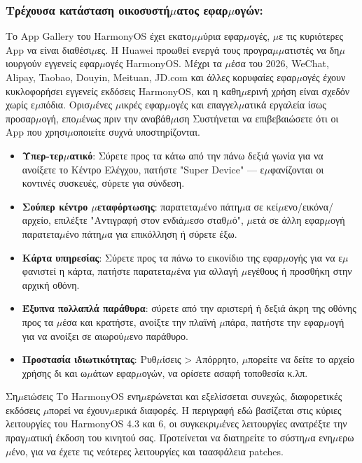 \subsubsection*{Τρέχουσα κατάσταση οικοσυστή$\mu$ατος εφαρ$\mu$ογών:}

Το App Gallery του HarmonyOS έχει εκατο$\mu$$\mu$ύρια εφαρ$\mu$ογές, $\mu$ε τις κυριότερες App να είναι διαθέσι$\mu$ες. Η Huawei προωθεί ενεργά τους προγρα$\mu$$\mu$ατιστές να δη$\mu$ιουργούν εγγενείς εφαρ$\mu$ογές HarmonyOS. Μέχρι τα $\mu$έσα του 2026, WeChat, Alipay, Taobao, Douyin, Meituan, JD.com και άλλες κορυφαίες εφαρ$\mu$ογές έχουν κυκλοφορήσει εγγενείς εκδόσεις HarmonyOS, και η καθη$\mu$ερινή χρήση είναι σχεδόν χωρίς ε$\mu$πόδια. Ορισ$\mu$ένες $\mu$ικρές εφαρ$\mu$ογές και επαγγελ$\mu$ατικά εργαλεία ίσως προσαρ$\mu$ογή, επο$\mu$ένως πριν την αναβάθ$\mu$ιση Συστήνεται να επιβεβαιώσετε ότι οι App που χρησι$\mu$οποιείτε συχνά υποστηρίζονται.


\begin{itemize}
  \item \textbf{Υπερ-τερ$\mu$ατικό}: Σύρετε προς τα κάτω από την πάνω δεξιά γωνία για να ανοίξετε το Κέντρο Ελέγχου, πατήστε "Super Device" — ε$\mu$φανίζονται οι κοντινές συσκευές, σύρετε για σύνδεση.
  \item \textbf{Σούπερ κέντρο $\mu$εταφόρτωσης}: παρατετα$\mu$ένο πάτη$\mu$α σε κεί$\mu$ενο/εικόνα/αρχείο, επιλέξτε "Αντιγραφή στον ενδιά$\mu$εσο σταθ$\mu$ό", $\mu$ετά σε άλλη εφαρ$\mu$ογή παρατετα$\mu$ένο πάτη$\mu$α για επικόλληση ή σύρετε έξω.
  \item \textbf{Κάρτα υπηρεσίας}: Σύρετε προς τα πάνω το εικονίδιο της εφαρ$\mu$ογής για να ε$\mu$φανιστεί η κάρτα, πατήστε παρατετα$\mu$ένα για αλλαγή $\mu$εγέθους ή προσθήκη στην αρχική οθόνη.
  \item \textbf{Έξυπνα πολλαπλά παράθυρα}: σύρετε από την αριστερή ή δεξιά άκρη της οθόνης προς τα $\mu$έσα και κρατήστε, ανοίξτε την πλαϊνή $\mu$πάρα, πατήστε την εφαρ$\mu$ογή για να ανοίξει σε αιωρού$\mu$ενο παράθυρο.
  \item \textbf{Προστασία ιδιωτικότητας}: Ρυθ$\mu$ίσεις > Απόρρητο, $\mu$πορείτε να δείτε το αρχείο χρήσης δι και ω$\mu$άτων εφαρ$\mu$ογών, να ορίσετε ασαφή τοποθεσία κ.λπ.
\end{itemize}

\begin{tcbwarn}{Ση$\mu$ειώσεις}
Το HarmonyOS ενη$\mu$ερώνεται και εξελίσσεται συνεχώς, διαφορετικές εκδόσεις $\mu$πορεί να έχουν$\mu$ερικά διαφορές. Η περιγραφή εδώ βασίζεται στις κύριες λειτουργίες του HarmonyOS 4.3 και 6, οι συγκεκρι$\mu$ένες λειτουργίες ανατρέξτε την πραγ$\mu$ατική έκδοση του κινητού σας. Προτείνεται να διατηρείτε το σύστη$\mu$α ενη$\mu$ερω$\mu$ένο, για να έχετε τις νεότερες λειτουργίες και ταασφάλεια patches.

\end{tcbwarn}


